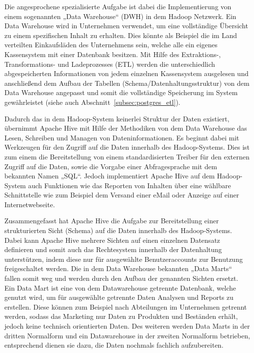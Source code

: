 Die angesprochene spezialisierte Aufgabe ist dabei die Implementierung von
einem sogenannten „Data Warehouse“ (DWH) in dem Hadoop Netzwerk. Ein Data
Warehouse wird in Unternehmen verwendet, um eine vollständige Übersicht zu
einem spezifischen Inhalt zu erhalten. Dies könnte als Beispiel die im Land
verteilten Einkaufsläden des Unternehmens sein, welche alle ein eigenes
Kassensystem mit einer Datenbank besitzen. Mit Hilfe des Extraktions-,
Transformations- und Ladeprozesses (ETL) werden die unterschiedlich
abgespeicherten Informationen von jedem einzelnen Kassensystem ausgelesen und
anschließend dem Aufbau der Tabellen (Schema/Datenhaltungsstruktur) von dem
Data Warehouse angepasst und somit die vollständige Speicherung im System
gewährleistet (siehe auch Abschnitt~\ref{subsec:postgres_etl}).

Dadurch das in dem Hadoop\hyp{}System keinerlei Struktur der Daten existiert,
übernimmt Apache Hive mit Hilfe der Methodiken von dem Data Warehouse das
Lesen, Schreiben und Managen von Dateninformationen. Es beginnt dabei mit
Werkzeugen für den Zugriff auf die Daten innerhalb des Hadoop\hyp{}Systems.
Dies ist zum einem die Bereitstellung von einem standardisierten \gls{Treiber}
für den externen Zugriff auf die Daten, sowie die Vorgabe einer Abfragesprache
mit dem bekannten Namen „\gls{SQL}“. Jedoch implementiert Apache Hive auf dem
Hadoop\hyp{}System auch Funktionen wie das Reporten von Inhalten über eine
wählbare Schnittstelle wie zum Beispiel dem Versand einer eMail oder Anzeige
auf einer Internetwebseite.

Zusammengefasst hat Apache Hive die Aufgabe zur Bereitstellung einer
strukturierten Sicht (Schema) auf die Daten innerhalb des Hadoop\hyp{}Systems.
Dabei kann Apache Hive mehrere Sichten auf einen einzelnen Datensatz definieren
und somit auch das Rechtesystem innerhalb der Datenhaltung unterstützen, indem
diese nur für ausgewählte Benutzeraccounts zur Benutzung freigeschaltet werden.
Die in dem Data Warehouse bekannten „Data Marts“ fallen somit weg und werden
durch den Aufbau der genannten Sichten ersetzt. Ein Data Mart ist eine von dem
Datawarehouse getrennte Datenbank, welche genutzt wird, um für ausgewählte
getrennte Daten Analysen und Reports zu erstellen. Diese können zum Beispiel
nach Abteilungen im Unternehmen getrennt werden, sodass das Marketing nur Daten
zu Produkten und Beständen erhält, jedoch keine technisch orientierten Daten.
Des weiteren werden Data Marts in der dritten Normalform und ein Datawarehouse
in der zweiten Normalform betrieben, entsprechend dienen sie dazu, die Daten
nochmals fachlich aufzubereiten.
\nl%

